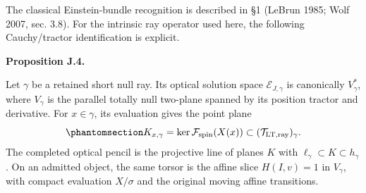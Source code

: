 \documentclass[
  english,
  11pt,
  reqno]{amsart}
\makeatletter
\newcommand{\pandocstatementheading}[1]{%
  \par\addpenalty{\@beginparpenalty}%
  \addvspace{.5\baselineskip plus .2\baselineskip minus .2\baselineskip}%
  {\normalfont\bfseries #1\par}%
  \nobreak\@afterindenttrue\@afterheading
}
\makeatother
\begin{document}
The classical Einstein-bundle recognition is described in §1 (LeBrun
1985; Wolf 2007, sec. 3.8). For the intrinsic ray operator used here,
the following Cauchy/tractor identification is explicit.

\pandocstatementheading{\protect{}\label{prop:gg-same-optical-point-pencil}Proposition J.4.}

Let \(\gamma\) be a retained short null ray. Its optical solution space
\(\mathcal E_{J,\gamma}\) is canonically \(V_\gamma^*\), where
\(V_\gamma\) is the parallel totally null two-plane spanned by its
position tractor and derivative. For \(x\in\gamma\), its evaluation
gives the point plane
\begin{equation}\protect\phantomsection\label{eq:gg-same-point-plane}{
 K_{x,\gamma}=\ker\mathcal F_{\mathrm{spin}}(X(x))
       \subset(\mathcal T_{\mathrm{LT,ray}})_\gamma.
}\end{equation} The completed optical pencil is the projective line of
planes \(K\) with \(\ell_\gamma\subset K\subset h_\gamma\). On an
admitted object, the same torsor is the affine slice \(H(I,v)=1\) in
\(V_\gamma\), with compact evaluation \(X/\sigma\) and the original
moving affine transitions.
\end{document}
